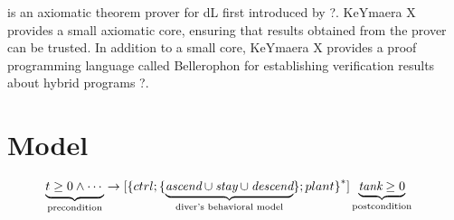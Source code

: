 \documentclass[sigconf,screen]{acmart}
\begin{document}
is an axiomatic theorem prover for dL first introduced by ?. KeYmaera X provides a small axiomatic core, ensuring that results obtained from the prover can be trusted. In addition to a small core, KeYmaera X provides a proof programming language called Bellerophon for establishing verification results about hybrid programs ?.



\section{ Model }
\begin{align*}
\underbrace{t \ge 0 \land \dotsm \vphantom{\dibox{}}}_{\text{precondition}} & 
\limply 
\dibox{\prepeat{ \{ ctrl;
\{ \underbrace{\textit{ascend} \cup \textit{stay} \cup \textit{descend}}_{\text{diver's behavioral model}} \}; plant 
\}
}}\underbrace{\textit{tank} \ge 0}_{\text{postcondition}}
\label{eq:carmodel}
\end{align*}
\end{document}
